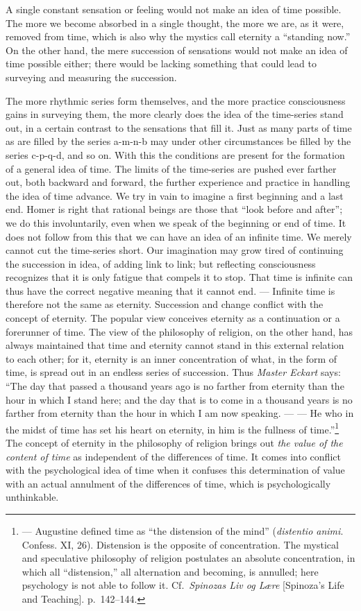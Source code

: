 \documentclass[12pt,a4paper]{book}
\newcommand{\opage}[1]{\marginnote{\footnotesize\textit{[#1]}}}
\begin{document}
A single constant sensation or feeling would not make an idea of time
possible. The more we become absorbed in a single thought, the more we
are, as it were, removed from time, which is also why the mystics call
eternity a ``standing now.'' On the other hand, the mere succession of
sensations would not
\opage{229}make an idea of time possible either; there would be lacking
something that could lead to surveying and measuring the succession.

The more rhythmic series form themselves, and the more practice
consciousness gains in surveying them, the more clearly does the idea of
the time-series stand out, in a certain contrast to the sensations that
fill it. Just as many parts of time as are filled by the series a-m-n-b
may under other circumstances be filled by the series c-p-q-d, and so
on. With this the conditions are present for the formation of a general
idea of time. The limits of the time-series are pushed ever farther out,
both backward and forward, the further experience and practice in
handling the idea of time advance. We try in vain to imagine a first
beginning and a last end. Homer is right that rational beings are those
that ``look before and after''; we do this involuntarily, even when we
speak of the beginning or end of time. It does not follow from this that
we can have an idea of an infinite time. We merely cannot cut the
time-series short. Our imagination may grow tired of continuing the
succession in idea, of adding link to link; but reflecting consciousness
recognizes that it is only fatigue that compels it to stop. That time is
infinite can thus have the correct negative meaning that it cannot end.
--- Infinite time is therefore not the same as eternity. Succession and
change conflict with the concept of eternity. The popular view conceives
eternity as a continuation or a forerunner of time. The view of the
philosophy of religion, on the other hand, has always maintained that
time and eternity cannot stand in this external relation to each other;
for it, eternity is an inner concentration of what, in the form of time,
is spread out in an endless series of succession. Thus \emph{Master
Eckart} says: ``The day that passed a thousand years ago is no farther
from eternity than the hour in which I stand here; and the day that is to
come in a thousand years is no farther from eternity than the hour in
which I am now speaking. --- --- He who in the midst of time has set his
heart on eternity, in him is the fullness of time.''\footnote{---
Augustine defined time as ``the distension of the mind'' (\textit{distentio
animi}. Confess. XI, 26). Distension is the opposite of concentration.
The mystical and speculative philosophy of religion postulates an
absolute concentration, in which all ``distension,'' all alternation and
becoming, is annulled; here psychology is not able to follow it. Cf.\
\textit{Spinozas Liv og Lære} [Spinoza's Life and Teaching].
p.~142--144.} The
\opage{230}concept of eternity in the philosophy of religion brings out
\emph{the value of the content of time} as independent of the
differences of time. It comes into conflict with the psychological idea
of time when it confuses this determination of value with an actual
annulment of the differences of time, which is psychologically
unthinkable.
\end{document}
